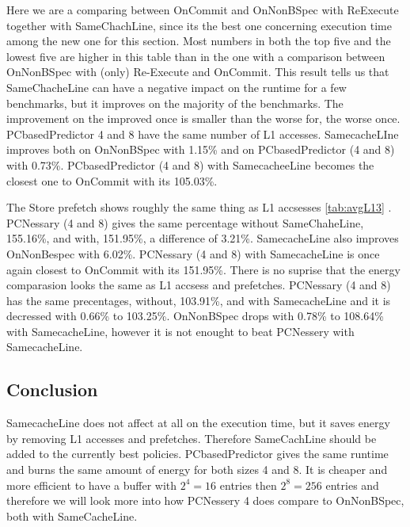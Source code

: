 Here we are a comparing between OnCommit and OnNonBSpec with ReExecute together with SameChachLine, since its the best one concerning execution time among the new one for this section. Most numbers in both the top five and the lowest five are higher in this table than in the one with a comparison between OnNonBSpec with (only) Re-Execute and OnCommit. This result tells us that SameChacheLine can have a negative impact on the runtime for a few benchmarks, but it improves on the majority of the benchmarks. The improvement on the improved once is smaller than the worse for, the worse once. 
\resAcc
{}
PCbasedPredictor 4 and 8 have the same number of L1 accesses. SamecacheLIne improves both on OnNonBSpec with 1.15\% and on PCbasedPredictor (4 and 8) with 0.73\%. PCbasedPredictor (4 and 8) with SamecacheeLine becomes the closest one to OnCommit with its 105.03\%.

\resSp
{}
The Store prefetch shows roughly the same thing as L1 accsesses \ref{tab:avgL13} . PCNessary (4 and 8) gives the same percentage without SameChaheLine, 155.16\%, and with, 151.95\%, a difference of 3.21\%. SamecacheLine also improves OnNonBespec with 6.02\%. PCNessary (4 and 8) with SamecacheLine is once again closest to OnCommit with its 151.95\%.   
\resEnergy
{}
There is no suprise that the energy comparasion looks the same as L1 accsess and prefetches. PCNessary (4 and 8) has the same precentages, without, 103.91\%, and with SamecacheLine and it is decressed with 0.66\% to 103.25\%. OnNonBSpec drops with 0.78\% to 108.64\% with SamecacheLine, however it is not enought to beat PCNessery with SamecacheLine.

\subsection{Conclusion}
SamecacheLine does not affect at all on the execution time, but it saves energy by removing L1 accesses and prefetches. Therefore SameCachLine should be added to the currently best policies. PCbasedPredictor gives the same runtime and burns the same amount of energy for both sizes 4 and 8. It is cheaper and more efficient to have a buffer with $2^4=16$ entries then $2^8=256$ entries and therefore we will look more into how PCNessery 4 does compare to OnNonBSpec, both with SameCacheLine.


